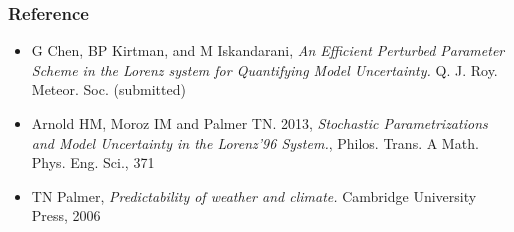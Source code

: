 \documentclass[graphics]{beamer}
\begin{document}
\begin{frame}
   \frametitle{Reference}
	\begin{itemize}
	   \item G Chen, BP Kirtman, and M Iskandarani, \emph{An Efficient Perturbed Parameter Scheme in the Lorenz system for Quantifying Model Uncertainty.} Q. J. Roy. Meteor. Soc. (submitted)
		\vspace{12pt}
	   \item Arnold HM, Moroz IM and Palmer TN. 2013, \emph{Stochastic Parametrizations and Model Uncertainty in the Lorenz'96 System.}, Philos. Trans. A Math. Phys. Eng. Sci., 371
		\vspace{12pt}
	   \item TN Palmer, \emph{Predictability of weather and climate.} Cambridge University Press, 2006

	\end{itemize}
\end{frame}
\end{document}
